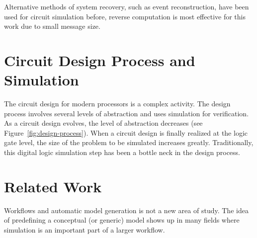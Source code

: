 Alternative methods of system recovery, such as event reconstruction, have been used for circuit simulation before, reverse computation \cite{carothers-rc} is most effective for this work due to small message size.

\section{Circuit Design Process and Simulation}

The circuit design for modern processors is a complex activity.
The design process involves several levels of abstraction and uses simulation for verification.
As a circuit design evolves, the level of abstraction decreases (see Figure~\ref{fig:design-process}).
When a circuit design is finally realized at the logic gate level, the size of the problem to be simulated increases greatly.
Traditionally, this digital logic simulation step has been a bottle neck in the design process.

\section{Related Work}

Workflows and automatic model generation is not a new area of study.
The idea of predefining a conceptual (or generic) model shows up in many fields where simulation is an important part of a larger workflow.
